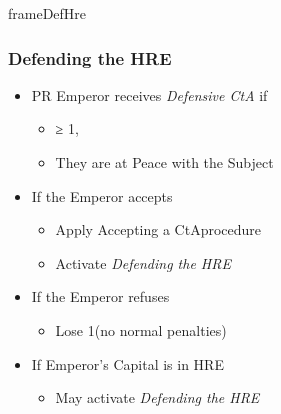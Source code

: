 \documentclass[10pt]{article}
\newlength{\fhDefHre} \setlength\fhDefHre{14\baselineskip}
\begin{document}
\begin{dynamiccontents*}{frameDefHre}\begin{eubox}{\fhDefHre}
	\begin{multicols}{2}
		\subsubsection*{Defending the HRE }
		\begin{itemize}
			\item PR Emperor receives \emph{Defensive CtA} if
			\begin{itemize}
				\item \authority ≥ 1, 
				\item They are at Peace with the Subject
			\end{itemize}
			\item If the Emperor accepts
			\begin{itemize}
				\item Apply \dprime Accepting a CtA\dprime procedure
				\item Activate \emph{Defending the HRE}
			\end{itemize}
			\item If the Emperor refuses
			\begin{itemize}
				\item Lose 1\authority (no normal penalties)
			\end{itemize}
		\end{itemize}
		\begin{itemize}
			\item If Emperor's Capital is in HRE
			\begin{itemize}
				\item May activate \emph{Defending the HRE}
				\begin{itemize}
				\end{itemize}
			\end{itemize}
		\end{itemize}

\end{multicols}
\end{eubox}
\end{dynamiccontents*}
\end{document}
